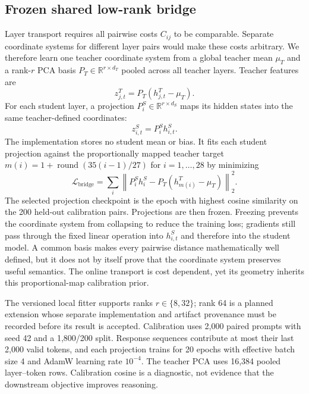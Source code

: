 \documentclass[10pt,twocolumn]{article}
\begin{document}
\subsection{Frozen shared low-rank bridge}

Layer transport requires all pairwise costs $C_{ij}$ to be comparable. Separate coordinate systems for different layer pairs would make these costs arbitrary. We therefore learn one teacher coordinate system from a global teacher mean $\mu_T$ and a rank-$r$ PCA basis $P_T\in\mathbb{R}^{r\times d_T}$ pooled across all teacher layers. Teacher features are
\begin{equation}
z^T_{j,t}=P_T(h^T_{j,t}-\mu_T).
\end{equation}
For each student layer, a projection $P^S_i\in\mathbb{R}^{r\times d_S}$ maps its hidden states into the same teacher-defined coordinates:
\begin{equation}
z^S_{i,t}=P^S_i h^S_{i,t}.
\end{equation}
The implementation stores no student mean or bias. It fits each student projection against the proportionally mapped teacher target $m(i)=1+\operatorname{round}(35(i-1)/27)$ for $i=1,\ldots,28$ by minimizing
\begin{equation}
\mathcal{L}_{\mathrm{bridge}}=
\sum_i\left\|P^S_i h^S_i-P_T(h^T_{m(i)}-\mu_T)\right\|_2^2.
\end{equation}
The selected projection checkpoint is the epoch with highest cosine similarity on the 200 held-out calibration pairs. Projections are then frozen. Freezing prevents the coordinate system from collapsing to reduce the training loss; gradients still pass through the fixed linear operation into $h^S_{i,t}$ and therefore into the student model. A common basis makes every pairwise distance mathematically well defined, but it does not by itself prove that the coordinate system preserves useful semantics. The online transport is cost dependent, yet its geometry inherits this proportional-map calibration prior.

The versioned local fitter supports ranks $r\in\{8,32\}$; rank 64 is a planned extension whose separate implementation and artifact provenance must be recorded before its result is accepted. Calibration uses 2,000 paired prompts with seed 42 and a 1,800/200 split. Response sequences contribute at most their last 2,000 valid tokens, and each projection trains for 20 epochs with effective batch size 4 and AdamW learning rate $10^{-4}$. The teacher PCA uses 16,384 pooled layer--token rows. Calibration cosine is a diagnostic, not evidence that the downstream objective improves reasoning.
\end{document}
